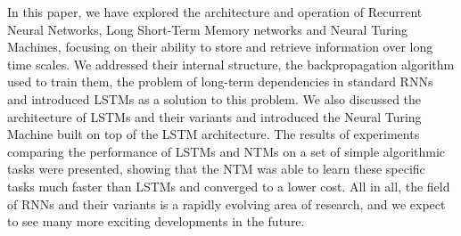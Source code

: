 \documentclass{article}
\begin{document}
In this paper, we have explored the architecture and operation of Recurrent Neural
Networks, Long Short-Term Memory networks and Neural Turing Machines, focusing on their
ability to store and retrieve information over long time scales. We addressed their
internal structure, the backpropagation algorithm used to train them, the problem of
long-term dependencies in standard RNNs and introduced LSTMs as a solution to this
problem. We also discussed the architecture of LSTMs and their variants and introduced the
Neural Turing Machine built on top of the LSTM architecture. The results of experiments
comparing the performance of LSTMs and NTMs on a set of simple algorithmic tasks were
presented, showing that the NTM was able to learn these specific tasks much faster than
LSTMs and converged to a lower cost. All in all, the field of RNNs and their variants is a
rapidly evolving area of research, and we expect to see many more exciting developments in
the future.



\newpage
\nocite{}


\end{document}
